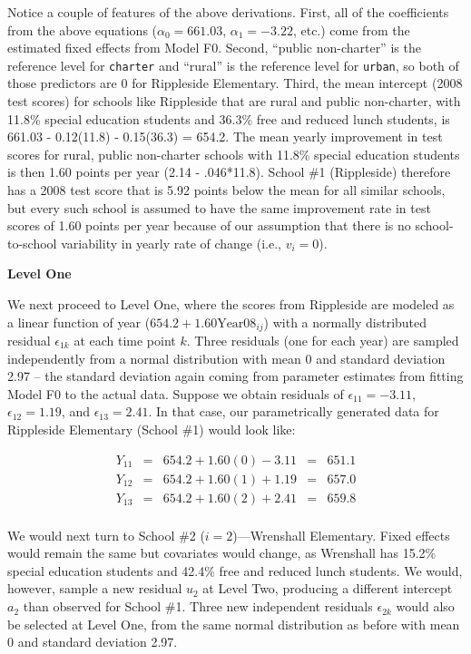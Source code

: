 \documentclass[
]{krantz}
\begin{document}
Notice a couple of features of the above derivations. First, all of the coefficients from the above equations (\(\alpha_{0}=661.03\), \(\alpha_{1}=-3.22\), etc.) come from the estimated fixed effects from Model F0. Second, ``public non-charter'' is the reference level for \texttt{charter} and ``rural'' is the reference level for \texttt{urban}, so both of those predictors are 0 for Rippleside Elementary. Third, the mean intercept (2008 test scores) for schools like Rippleside that are rural and public non-charter, with 11.8\% special education students and 36.3\% free and reduced lunch students, is 661.03 - 0.12(11.8) - 0.15(36.3) = 654.2. The mean yearly improvement in test scores for rural, public non-charter schools with 11.8\% special education students is then 1.60 points per year (2.14 - .046*11.8). School \#1 (Rippleside) therefore has a 2008 test score that is 5.92 points below the mean for all similar schools, but every such school is assumed to have the same improvement rate in test scores of 1.60 points per year because of our assumption that there is no school-to-school variability in yearly rate of change (i.e., \(v_{i}=0\)).

\textbf{Level One}

We next proceed to Level One, where the scores from Rippleside are modeled as a linear function of year (\(654.2 + 1.60\textrm{Year08}_{ij}\)) with a normally distributed residual \(\epsilon_{1k}\) at each time point \(k\). Three residuals (one for each year) are sampled independently from a normal distribution with mean 0 and standard deviation 2.97 -- the standard deviation again coming from parameter estimates from fitting Model F0 to the actual data. Suppose we obtain residuals of \(\epsilon_{11}=-3.11\), \(\epsilon_{12}=1.19\), and \(\epsilon_{13}=2.41\). In that case, our parametrically generated data for Rippleside Elementary (School \#1) would look like:

\[ \begin{array}{rcccl}
   Y_{11} & = & 654.2+1.60(0)-3.11 & = & 651.1 \\
   Y_{12} & = & 654.2+1.60(1)+1.19 & = & 657.0 \\
   Y_{13} & = & 654.2+1.60(2)+2.41 & = & 659.8 \\
   \end{array} \]

We would next turn to School \#2 (\(i=2\))---Wrenshall Elementary. Fixed effects would remain the same but covariates would change, as Wrenshall has 15.2\% special education students and 42.4\% free and reduced lunch students. We would, however, sample a new residual \(u_{2}\) at Level Two, producing a different intercept \(a_{2}\) than observed for School \#1. Three new independent residuals \(\epsilon_{2k}\) would also be selected at Level One, from the same normal distribution as before with mean 0 and standard deviation 2.97.
\end{document}
